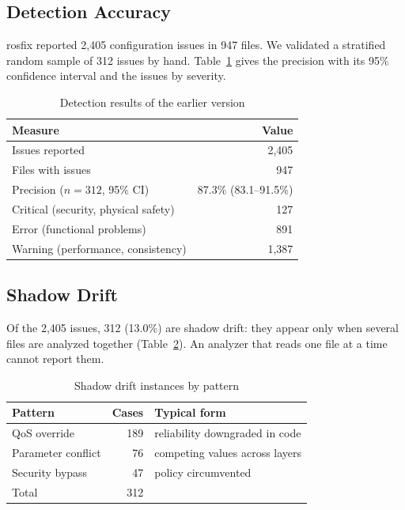 \documentclass[conference]{IEEEtran}
\begin{document}
\subsection{Detection Accuracy}
\label{sec:accuracy}

rosfix reported 2,405 configuration issues in 947 files. We validated a stratified random sample
of 312 issues by hand. Table~\ref{tab:accuracy} gives the precision with its 95\% confidence
interval and the issues by severity.

\begin{table}[t]
\centering
\caption{Detection results of the earlier version}
\label{tab:accuracy}
\footnotesize
\begin{tabular}{@{}lr@{}}
\toprule
Measure & Value\\
\midrule
Issues reported & 2{,}405\\
Files with issues & 947\\
Precision ($n=312$, 95\% CI) & 87.3\% (83.1--91.5\%)\\
\midrule
Critical (security, physical safety) & 127\\
Error (functional problems) & 891\\
Warning (performance, consistency) & 1{,}387\\
\bottomrule
\end{tabular}
\end{table}

\subsection{Shadow Drift}
\label{sec:drift}

Of the 2,405 issues, 312 (13.0\%) are shadow drift: they appear only when several files are
analyzed together (Table~\ref{tab:drift}). An analyzer that reads one file at a time cannot
report them.

\begin{table}[t]
\centering
\caption{Shadow drift instances by pattern}
\label{tab:drift}
\footnotesize
\begin{tabular}{@{}lrl@{}}
\toprule
Pattern & Cases & Typical form\\
\midrule
QoS override        & 189 & reliability downgraded in code\\
Parameter conflict  &  76 & competing values across layers\\
Security bypass     &  47 & policy circumvented\\
\midrule
Total               & 312 & \\
\bottomrule
\end{tabular}
\end{table}
\end{document}
